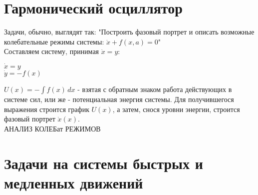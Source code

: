 \newcommand{\colontitulAutors}{astronom\_v\_cube et}
\newcommand{\colontitulYear}{2022}
\newcommand{\colontitulEducationalSubject}{Алгоритмы решения задач по теории колебаний}
\newcommand{\colontitulTeacher}{LaTex}




	\small
	\begin{multicols*}{2}

		\section{Гармонический осциллятор}

		Задачи, обычно, выглядят так:
		"Построить фазовый портрет и описать возможные колебательные режимы системы: $ \ddot{x} + f(x, a) = 0 $"\\
		Составляем систему, принимая $\dot{x} = y$:\\
		\begin{cases}
			$\dot{x} = y$\\
			$\dot{y} = -f(x)$
		\end{cases}
		$U(x) = -\int f(x) \,dx $ - взятая с обратным знаком работа действующих в системе сил, или же - потенциальная энергия системы. Для  получившегося выражения строится график $U(x)$, а затем, снося уровни энергии, строится фазовый портрет $\dot{x}(x)$.\\
		АНАЛИЗ КОЛЕБат РЕЖИМОВ


		\section{Задачи на системы быстрых и медленных движений}


	\end{multicols*}
